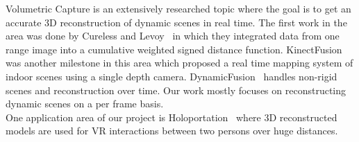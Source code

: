 \documentclass[10pt,twocolumn,letterpaper]{article}
\begin{document}
Volumetric Capture is an extensively researched topic where the goal is to get an accurate 3D reconstruction of dynamic scenes in real time. The first work in the area was done by Cureless and Levoy~\cite{Authors4} in which they integrated data from one range image into a cumulative weighted signed distance function. KinectFusion~\cite{Authors5} was another milestone in this area which proposed a real time mapping system of indoor scenes using a single depth camera. DynamicFusion~\cite{Authors6} handles non-rigid scenes and reconstruction over time. Our work mostly focuses on reconstructing dynamic scenes on a per frame basis.\\
One application area of our project is Holoportation~\cite{Authors7} where 3D reconstructed models are used for VR interactions between two persons over huge distances.
\end{document}
